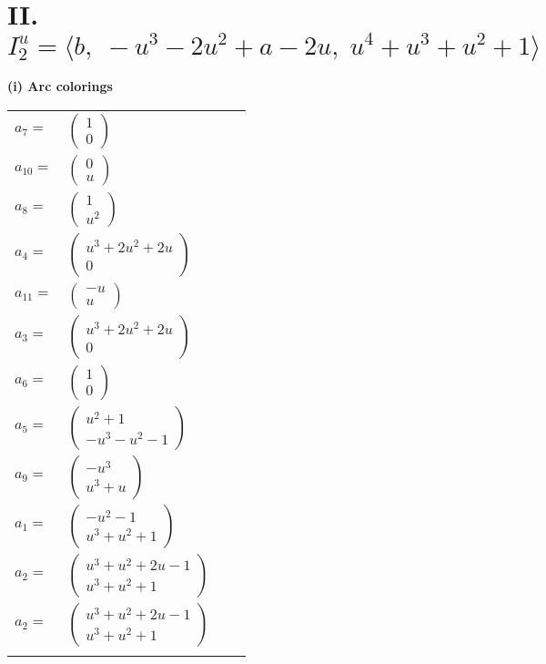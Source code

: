 \documentclass[1p]{elsarticle_modified}
\theoremstyle{definition}
\begin{document}
\centering \section*{II. $I^u_{2}= \langle b,\;- u^3-2 u^2+a-2 u,\;u^4+u^3+u^2+1 \rangle$}
\flushleft \textbf{(i) Arc colorings}\\
\begin{tabular}{m{7pt} m{180pt} m{7pt} m{180pt} }
\flushright $a_{7}=$&$\begin{pmatrix}1\\0\end{pmatrix}$ \\
\flushright $a_{10}=$&$\begin{pmatrix}0\\u\end{pmatrix}$ \\
\flushright $a_{8}=$&$\begin{pmatrix}1\\u^2\end{pmatrix}$ \\
\flushright $a_{4}=$&$\begin{pmatrix}u^3+2 u^2+2 u\\0\end{pmatrix}$ \\
\flushright $a_{11}=$&$\begin{pmatrix}- u\\u\end{pmatrix}$ \\
\flushright $a_{3}=$&$\begin{pmatrix}u^3+2 u^2+2 u\\0\end{pmatrix}$ \\
\flushright $a_{6}=$&$\begin{pmatrix}1\\0\end{pmatrix}$ \\
\flushright $a_{5}=$&$\begin{pmatrix}u^2+1\\- u^3- u^2-1\end{pmatrix}$ \\
\flushright $a_{9}=$&$\begin{pmatrix}- u^3\\u^3+u\end{pmatrix}$ \\
\flushright $a_{1}=$&$\begin{pmatrix}- u^2-1\\u^3+u^2+1\end{pmatrix}$ \\
\flushright $a_{2}=$&$\begin{pmatrix}u^3+u^2+2 u-1\\u^3+u^2+1\end{pmatrix}$\\ \flushright $a_{2}=$&$\begin{pmatrix}u^3+u^2+2 u-1\\u^3+u^2+1\end{pmatrix}$\\&\end{tabular}
\end{document}
